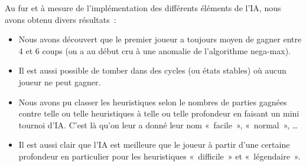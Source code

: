 Au fur et à mesure de l'implémentation des différents éléments de l'IA, nous avons obtenu divers résultats :

\begin{itemize}
    \item Nous avons découvert que le premier joueur a toujours moyen de gagner entre 4 et 6 coups
        (on a au début cru à une anomalie de l'algorithme nega-max).
    \item Il est aussi possible de tomber dans des cycles (ou états stables) où aucun joueur ne peut gagner.
    \item Nous avons pu classer les heuristiques selon le nombres de parties gagnées contre telle ou telle heuristiques à
        telle ou telle profondeur en faisant un mini tournoi d'IA\@. C'est là qu'on leur a donné leur nom « facile », « normal », …
    \item Il est aussi clair que l'IA est meilleure que le joueur à partir d'une certaine profondeur en particulier pour les
        heuristiques « difficile » et « légendaire ».
\end{itemize}

